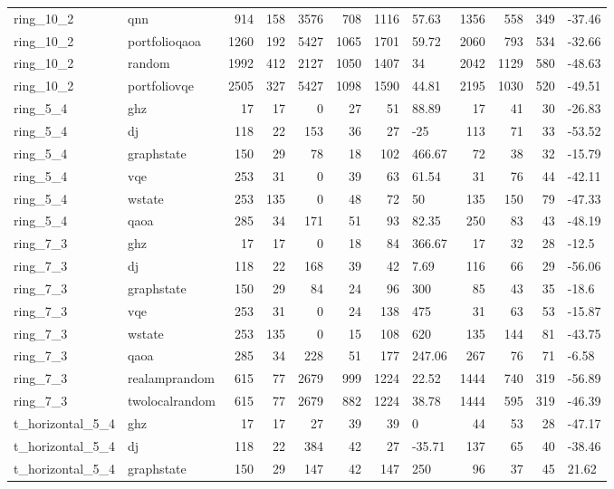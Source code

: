 \begin{longtable}{llrrrrrlrrrl}
ring\_10\_2 & qnn & 914 & 158 & 3576 & 708 & 1116 & 57.63 & 1356 & 558 & 349 & -37.46 \\
ring\_10\_2 & portfolioqaoa & 1260 & 192 & 5427 & 1065 & 1701 & 59.72 & 2060 & 793 & 534 & -32.66 \\
ring\_10\_2 & random & 1992 & 412 & 2127 & 1050 & 1407 & 34 & 2042 & 1129 & 580 & -48.63 \\
ring\_10\_2 & portfoliovqe & 2505 & 327 & 5427 & 1098 & 1590 & 44.81 & 2195 & 1030 & 520 & -49.51 \\
ring\_5\_4 & ghz & 17 & 17 & 0 & 27 & 51 & 88.89 & 17 & 41 & 30 & -26.83 \\
ring\_5\_4 & dj & 118 & 22 & 153 & 36 & 27 & -25 & 113 & 71 & 33 & -53.52 \\
ring\_5\_4 & graphstate & 150 & 29 & 78 & 18 & 102 & 466.67 & 72 & 38 & 32 & -15.79 \\
ring\_5\_4 & vqe & 253 & 31 & 0 & 39 & 63 & 61.54 & 31 & 76 & 44 & -42.11 \\
ring\_5\_4 & wstate & 253 & 135 & 0 & 48 & 72 & 50 & 135 & 150 & 79 & -47.33 \\
ring\_5\_4 & qaoa & 285 & 34 & 171 & 51 & 93 & 82.35 & 250 & 83 & 43 & -48.19 \\
ring\_7\_3 & ghz & 17 & 17 & 0 & 18 & 84 & 366.67 & 17 & 32 & 28 & -12.5 \\
ring\_7\_3 & dj & 118 & 22 & 168 & 39 & 42 & 7.69 & 116 & 66 & 29 & -56.06 \\
ring\_7\_3 & graphstate & 150 & 29 & 84 & 24 & 96 & 300 & 85 & 43 & 35 & -18.6 \\
ring\_7\_3 & vqe & 253 & 31 & 0 & 24 & 138 & 475 & 31 & 63 & 53 & -15.87 \\
ring\_7\_3 & wstate & 253 & 135 & 0 & 15 & 108 & 620 & 135 & 144 & 81 & -43.75 \\
ring\_7\_3 & qaoa & 285 & 34 & 228 & 51 & 177 & 247.06 & 267 & 76 & 71 & -6.58 \\
ring\_7\_3 & realamprandom & 615 & 77 & 2679 & 999 & 1224 & 22.52 & 1444 & 740 & 319 & -56.89 \\
ring\_7\_3 & twolocalrandom & 615 & 77 & 2679 & 882 & 1224 & 38.78 & 1444 & 595 & 319 & -46.39 \\
t\_horizontal\_5\_4 & ghz & 17 & 17 & 27 & 39 & 39 & 0 & 44 & 53 & 28 & -47.17 \\
t\_horizontal\_5\_4 & dj & 118 & 22 & 384 & 42 & 27 & -35.71 & 137 & 65 & 40 & -38.46 \\
t\_horizontal\_5\_4 & graphstate & 150 & 29 & 147 & 42 & 147 & 250 & 96 & 37 & 45 & 21.62 \\

\end{longtable}
